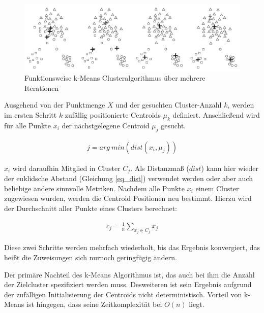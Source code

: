 \begin{figure}[H]
    \centering
    \includegraphics[width=0.9\linewidth]{resources/img/grundlagen/k-means}
    \caption[Funktionsweise k-Means Clusteralgorithmus]{Funktionsweise k-Means Clusteralgorithmus über mehrere Iterationen \cite[]{tan2007introduction}}
    \label{fig:grund_kmeans_clustering}
\end{figure}

Ausgehend von der Punktmenge $X$ und der gesuchten Cluster-Anzahl $k$,
werden im ersten Schritt $k$ zufällig positionierte Centroids $\mu_k$ definiert.
Anschließend wird für alle Punkte $x_i$ der nächstgelegene Centroid $\mu_j$ gesucht.

\begin{ceqn}
\begin{align}
    \label{eq_kmeans2}
    j = arg\ min(dist(x_i, \mu_j))
\end{align}
\end{ceqn}

$x_i$ wird daraufhin Mitglied in Cluster $C_j$. Als Distanzmaß ($dist$) kann hier wieder der euklidsche Abstand
(Gleichung \ref{eq_dist}) verwendet werden oder aber auch beliebige andere sinnvolle Metriken.
Nachdem alle Punkte $x_i$ einem Cluster zugewiesen wurden, werden die Centroid Positionen neu bestimmt.
Hierzu wird der Durchschnitt aller Punkte eines Clusters berechnet:

\begin{ceqn}
\begin{align}
    \label{eq_kmeans3}
    c_j = \frac{1}{n} \sum_{x_j \in C_j} x_j
\end{align}
\end{ceqn}

Diese zwei Schritte werden mehrfach wiederholt, bis das Ergebnis konvergiert, das heißt die Zuweisungen sich
nurnoch geringfügig ändern. \cite[]{Jain2010}

Der primäre Nachteil des k-Means Algorithmus ist, das auch bei ihm die Anzahl der Zielcluster spezifiziert
werden muss. Desweiteren ist sein Ergebnis aufgrund der zufälligen Initialisierung der Centroids
nicht deterministisch. Vorteil von k-Means ist hingegen, dass seine Zeitkomplexität bei $O(n)$ liegt.

